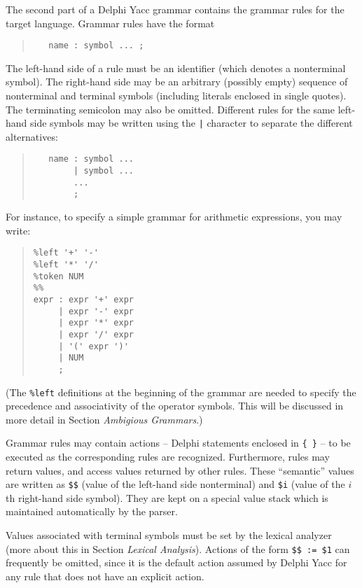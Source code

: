 \documentclass[a4paper]{article}
\begin{document}
The second part of a Delphi Yacc grammar contains the grammar rules for the
target language. Grammar rules have the format

\begin{quote}\begin{verbatim}
   name : symbol ... ;
\end{verbatim}\end{quote}

The left-hand side of a rule must be an identifier (which denotes a
nonterminal symbol). The right-hand side may be an arbitrary (possibly
empty) sequence of nonterminal and terminal symbols (including literals
enclosed in single quotes). The terminating semicolon may also be omitted.
Different rules for the same left-hand side symbols may be written using
the \verb"|" character to separate the different alternatives:

\begin{quote}\begin{verbatim}
   name : symbol ...
        | symbol ...
        ...
        ;
\end{verbatim}\end{quote}

For instance, to specify a simple grammar for arithmetic expressions, you
may write:

\begin{quote}\begin{verbatim}
%left '+' '-'
%left '*' '/'
%token NUM
%%
expr : expr '+' expr
     | expr '-' expr
     | expr '*' expr
     | expr '/' expr
     | '(' expr ')'
     | NUM
     ;
\end{verbatim}\end{quote}

(The \verb"%left" definitions at the beginning of the grammar are needed to
specify the precedence and associativity of the operator symbols. This will be
discussed in more detail in Section {\em Ambigious Grammars\/}.)

Grammar rules may contain actions -- Delphi statements enclosed in
\verb"{ }" -- to be executed as the corresponding rules are recognized.
Furthermore, rules may return values, and access values returned by other
rules. These ``semantic'' values are written as \verb"$$" (value of the
left-hand side nonterminal) and \verb"$i" (value of the $i$th right-hand
side symbol). They are kept on a special value stack which is maintained
automatically by the parser.

Values associated with terminal symbols must be set by the lexical analyzer
(more about this in Section {\em Lexical Analysis\/}). Actions of the form
\verb"$$ := $1" can frequently be omitted, since it is the default action
assumed by Delphi Yacc for any rule that does not have an explicit action.
\end{document}
